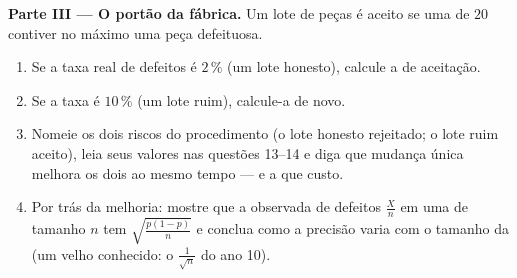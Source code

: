 \begin{problem}
\medskip
\noindent\textbf{Parte III --- O portão da fábrica.}
Um lote de peças é aceito se uma  de $20$ contiver no
máximo uma peça defeituosa.
\begin{enumerate}[resume]
  \item Se a taxa real de defeitos é $2\,\%$ (um lote honesto),
        calcule a  de aceitação.
  \item Se a taxa é $10\,\%$ (um lote ruim), calcule-a de novo.
  \item Nomeie os dois riscos do procedimento (o lote honesto
        rejeitado; o lote ruim aceito), leia seus valores nas
        questões 13--14 e diga que mudança única melhora os
        dois ao mesmo tempo --- e a que custo.
  \item Por trás da melhoria: mostre que a \emph{}
        observada de defeitos $\frac Xn$ em uma  de
        tamanho $n$ tem 
        $\sqrt{\frac{p(1-p)}{n}}$ e conclua como a precisão
        varia com o tamanho da  (um velho conhecido: o
        $\frac{1}{\sqrt n}$ do ano 10).
\end{enumerate}


\end{problem}
